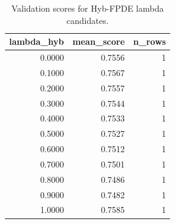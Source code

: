\begin{table}[t]
\caption{Validation scores for Hyb-FPDE lambda candidates.}
\label{tab:lambda_distribution_computed}
\centering
\begin{tabular}{rrr}
\toprule
lambda\_hyb & mean\_score & n\_rows \\
\midrule
0.0000 & 0.7556 & 1 \\
0.1000 & 0.7567 & 1 \\
0.2000 & 0.7557 & 1 \\
0.3000 & 0.7544 & 1 \\
0.4000 & 0.7533 & 1 \\
0.5000 & 0.7527 & 1 \\
0.6000 & 0.7512 & 1 \\
0.7000 & 0.7501 & 1 \\
0.8000 & 0.7486 & 1 \\
0.9000 & 0.7482 & 1 \\
1.0000 & 0.7585 & 1 \\
\bottomrule
\end{tabular}

\end{table}
